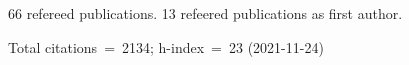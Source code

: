 66 refereed publications. 13 refeered publications as first author.

Total citations~=~2134; h-index~=~23 (2021-11-24)
